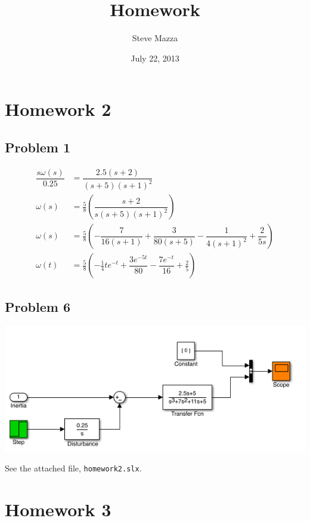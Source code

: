 \documentclass[letterpaper,10pt]{article}
\title{Homework}
\author{Steve Mazza}
\date{July 22, 2013}
\begin{document}
\maketitle

\section*{Homework 2}
\subsection*{Problem 1}
\begin{align*}
	\dfrac{s\omega(s)}{0.25} &= \dfrac{2.5(s+2)}{(s+5)(s+1)^2} \\
	\omega(s) &= \frac{5}{8}\left(\dfrac{s+2}{s(s+5)(s+1)^2}\right) \\
	\omega(s) &= \frac{5}{8}\left(-\dfrac{7}{16(s+1)} + \dfrac{3}{80(s+5)} - \dfrac{1}{4(s+1)^2}+ \dfrac{2}{5s}\right) \\
	\omega(t) &= \frac{5}{8}\left(-\frac{1}{4}te^{-t} + \dfrac{3e^{-5t}}{80} - \dfrac{7e^{-t}}{16} + \frac{2}{5}\right)
\end{align*}

\subsection*{Problem 6}
\begin{center}
	\includegraphics[scale=0.75]{simulink-h2.png}
\end{center}
See the attached file, \texttt{homework2.slx}.

\section*{Homework 3}
\end{document}
